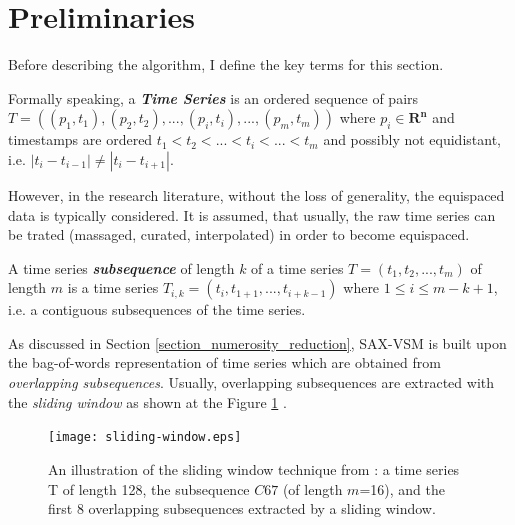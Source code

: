 \section{Preliminaries}
Before describing the algorithm, I define the key terms for this section.
\begin{defn}\label{def_timeseries}
Formally speaking, a \textbf{\textit{Time Series}} is an ordered sequence of pairs \linebreak
\mbox{$T=((p_{1},t_{1}),(p_{2},t_{2}),...,(p_{i},t_{i}),...,(p_{m},t_{m}))$} where $p_{i} \in \mathbf{R^{n}}$
and timestamps are ordered \linebreak 
$t_{1} < t_{2} < ... < t_{i} <...<t_{m}$ and possibly not equidistant, i.e. $|t_{i}-t_{i-1}| \neq |t_{i}-t_{i+1}|$.
\end{defn}
However, in the research literature, without the loss of generality, the equispaced data is typically considered.
It is assumed, that usually, the raw time series can be trated (massaged, curated, interpolated) in order to become equispaced.

\begin{defn}\label{def_subsequence}
A time series \textbf{\textit{subsequence}} of length $k$ of a time series $T = (t_{1}, t_{2},...,t_{m})$ of length $m$ is a time 
series $T_{i,k} = (t_{i},t_{1+1},...,t_{i+k-1})$  where $1 \leq i \leq m - k + 1$, i.e. a contiguous subsequences of the time series.
\end{defn}

As discussed in Section \ref{section_numerosity_reduction}, SAX-VSM is built upon the bag-of-words representation of time
series which are obtained from \textit{overlapping subsequences}. Usually, overlapping subsequences are extracted with the 
\textit{sliding window} as shown at the Figure \ref{fig:sliding_window} \cite{citeulike:3977965} \cite{citeulike:3175749}.

\begin{figure}[tbp]
   \centering
   \texttt{[image: sliding-window.eps]}
   \caption{An illustration of the sliding window technique from \cite{citeulike:2821475}: a time series T of length 128, 
   the subsequence $C67$ (of length $m$=16), and the first 8 overlapping subsequences extracted by a sliding window.}
   \label{fig:sliding_window}
\end{figure}

